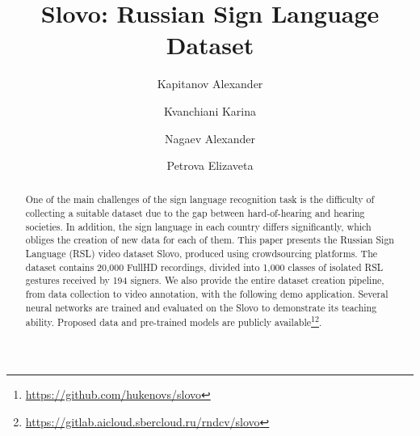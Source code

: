 \documentclass[runningheads]{llncs}
\begin{document}
\title{Slovo: Russian Sign Language Dataset}


\author{Kapitanov Alexander \and
Kvanchiani Karina \and Nagaev Alexander \and Petrova Elizaveta}


\maketitle              \begin{abstract}
One of the main challenges of the sign language recognition task is the difficulty of collecting a suitable dataset due to the gap between hard-of-hearing and hearing societies. In addition, the sign language in each country differs significantly, which obliges the creation of new data for each of them. This paper presents the Russian Sign Language (RSL) video dataset Slovo, produced using crowdsourcing platforms. The dataset contains 20,000 FullHD recordings, divided into 1,000 classes of isolated RSL gestures received by 194 signers. We also provide the entire dataset creation pipeline, from data collection to video annotation, with the following demo application. Several neural networks are trained and evaluated on the Slovo to demonstrate its teaching ability. Proposed data and pre-trained models are publicly available\footnote{\url{https://github.com/hukenovs/slovo}}\footnote{\url{https://gitlab.aicloud.sbercloud.ru/rndcv/slovo}}.

\end{abstract}
\end{document}
